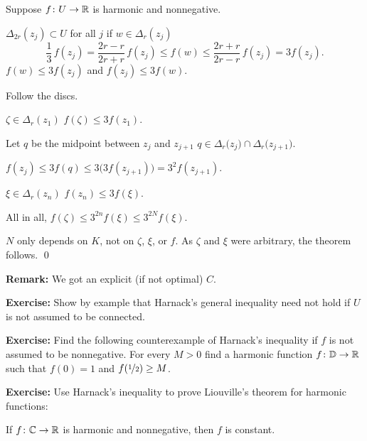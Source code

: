 \documentclass[10pt,aspectratio=169]{beamer}
\begin{document}
\begin{frame}
Suppose $f \colon U \to {\mathbb{R}}$ is harmonic and nonnegative.

\medskip
\pause

$\Delta_{2r}(z_j) \subset U$ for all $j$ \pause \wthus if $w \in \Delta_r(z_j)$
\pause
\quad \thus
\[
\frac{1}{3} \, f(z_j) = 
\frac{2r-r}{2r+r}\, f(z_j)
\leq
f(w)
\leq \frac{2r+r}{2r-r}\, f(z_j)
= 3 f(z_j) .
\]
\pause
\thus\quad $f(w) \leq 3 f(z_j)$ and $f(z_j) \leq 3 f(w)$.

\pause
\medskip

Follow the discs.

\medskip
\pause

$\zeta \in \Delta_r(z_1)$ \wthus
$f(\zeta) \leq 3 f(z_1)$.

\pause
\medskip

Let 
$q$ be the midpoint between $z_{j}$ and $z_{j+1}$
\wthus
$q \in \Delta_{r}\bigl(z_{j}\bigr) \cap \Delta_{r}\bigl(z_{j+1}\bigr)$.

\pause
\medskip
\thus
\quad
$f(z_j) \leq 3 f(q) \leq 3 \bigl( 3 f(z_{j+1}) \bigr) = 3^2 f(z_{j+1})$.

\pause
\medskip

$\xi \in \Delta_r(z_n)$ \wthus
$f(z_n) \leq 3 f(\xi)$.

\pause
\medskip

All in all, \quad
$f(\zeta) \leq
3^{2n}
f(\xi)
\leq
3^{2N}
f(\xi)$.

\pause
\medskip

$N$ only depends on $K$, not on $\zeta$, $\xi$, or $f$.
As $\zeta$ and $\xi$ were arbitrary, the theorem follows. \qed

\medskip
\pause

\textbf{Remark:} We got an explicit (if not optimal) $C$.
\end{frame}

\begin{frame}
\textbf{Exercise:}
Show by example that Harnack's general inequality need not hold if $U$
is not assumed to be connected.

\medskip
\pause

\textbf{Exercise:}
Find the following counterexample of Harnack's inequality
if $f$ is not assumed to be
nonnegative.  For every $M > 0$ find
a harmonic function $f \colon {\mathbb{D}} \to {\mathbb{R}}$ such that $f(0) = 1$ and
$f(\nicefrac{1}{2}) \geq M$.

\medskip
\pause

\textbf{Exercise:}
Use Harnack's inequality to prove Liouville's theorem
for harmonic functions:

If $f \colon {\mathbb{C}} \to {\mathbb{R}}$ is harmonic
and nonnegative, then $f$ is constant.
\end{frame}
\end{document}
